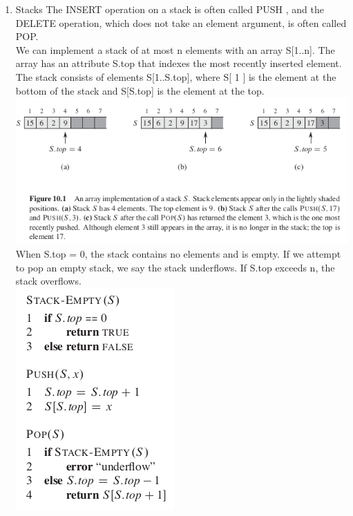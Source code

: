 \documentclass[11pt]{article}
\begin{document}
\begin{enumerate}
\item Stacks
\label{sec-4-1-1-1}
The INSERT operation on a stack is often called PUSH , and the DELETE operation, which does not take an element argument, is often called POP. \\

We can implement a stack of at most n elements with an array S[1..n]. The array has an attribute S.top that indexes the most recently inserted element. The stack consists of elements S[1..S.top], where S[ 1 ] is the element at the bottom of the stack and S[S.top] is the element at the top. \\

\includegraphics[width=.9\linewidth]{pics/c10_stack_fig.png} \\

When S.top = 0, the stack contains no elements and is empty. If we attempt to pop an empty stack, we say the stack underflows. If S.top exceeds n, the stack overflows. \\

\includegraphics[width=.9\linewidth]{pics/c10_stack.png} \\


\end{enumerate}
\end{document}
